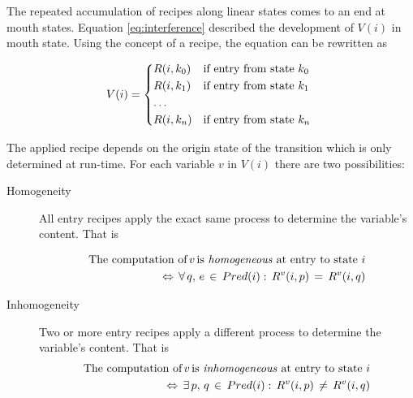\documentclass[12pt,a4paper]{scrartcl}
\begin{document}
The repeated accumulation of recipes along linear states comes to an end at
mouth states.  Equation \eqref{eq:interference} described the development of
$V(i)$ in mouth state. Using the concept of a recipe, the equation can be
rewritten as

\begin{eqnarray}
    V(i)  =  \begin{dcases*}
               R(i,k_0) &  if entry from state $k_0$ \\
               R(i,k_1) &  if entry from state $k_1$ \\
               \dots                                 \\
               R(i,k_n) &  if entry from state $k_n$
            \end{dcases*}
\end{eqnarray}

The applied recipe depends on the origin state of the transition which is only
determined at run-time.  For each variable $v$ in $V(i)$ there are two
possibilities:

\begin{description}
    \item[Homogeneity] All entry recipes apply the exact same process to
                       determine the variable's content. That is

    \begin{equation}
        \begin{aligned}
        \mbox{The computation of}\,v\,\mbox{is \textit{homogeneous} at entry to state $i$}\\
        \Leftrightarrow\,\forall\,q,\,e\,\in\,Pred(i):\,R^v(i,p)\,=\,R^v(i,q) 
        \end{aligned}
    \end{equation}

    \item[Inhomogeneity] Two or more entry recipes apply a different process
                         to determine the variable's content. That is
    \begin{equation}
        \begin{aligned}
        \mbox{The computation of}\,v\,\mbox{is \textit{inhomogeneous} at entry to state $i$}\\
        \Leftrightarrow\,\exists\,p,\,q\,\in\,Pred(i):\,R^v(i,p)\,\neq\,R^v(i,q)
        \end{aligned}
    \end{equation}
\end{description}
\end{document}
